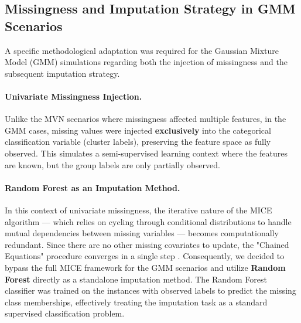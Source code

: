 \documentclass[11pt, a4paper]{article}
\begin{document}
\subsection{Missingness and Imputation Strategy in GMM Scenarios}

A specific methodological adaptation was required for the Gaussian Mixture Model (GMM) simulations regarding both the injection of missingness and the subsequent imputation strategy.

\paragraph{Univariate Missingness Injection.}
Unlike the MVN scenarios where missingness affected multiple features, in the GMM cases, missing values were injected \textbf{exclusively} into the categorical classification variable (cluster labels), preserving the feature space as fully observed.
This simulates a semi-supervised learning context where the features are known, but the group labels are only partially observed.

\paragraph{Random Forest as an Imputation Method.}
In this context of univariate missingness, the iterative nature of the MICE algorithm — which relies on cycling through conditional distributions to handle mutual dependencies between missing variables — becomes computationally redundant.
Since there are no other missing covariates to update, the "Chained Equations" procedure converges in a single step \citep{Stekhoven2012}.
Consequently, we decided to bypass the full MICE framework for the GMM scenarios and utilize \textbf{Random Forest} directly as a standalone imputation method.
The Random Forest classifier was trained on the instances with observed labels to predict the missing class memberships, effectively treating the imputation task as a standard supervised classification problem.
\end{document}
